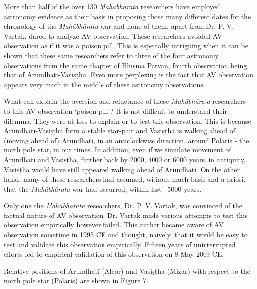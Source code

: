 More than half of the over 130 \textit{Mahābhārata} researchers have employed astronomy evidence as their basis in proposing those many different dates for the chronology of the \textit{Mahābhārata} war and none of them, apart from Dr. P. V. Vartak, dared to analyze AV observation. These researchers avoided AV observation as if it was a poison pill. This is especially intriguing when it can be shown that these same researchers refer to three of the four astronomy observations from the same chapter of Bhīṣma Parvan, fourth observation being that of Arundhatī-Vasiṣṭha. Even more perplexing is the fact that AV observation appears very much in the middle of these astronomy observations.

What can explain the aversion and reluctance of these \textit{Mahābhārata} researchers to this AV observation ‘poison pill’? It is not difficult to understand their dilemma. They were at loss to explain or to test this observation. This is because Arundhatī-Vasiṣṭha form a stable star-pair and Vasiṣṭha is walking ahead of (moving ahead of) Arundhati, in an anticlockwise direction, around Polaris - the north pole star, in our times. In addition, even if we simulate movement of Arundhatī and Vasiṣṭha, further back by 2000, 4000 or 6000 years, in antiquity, Vasiṣṭha would have still appeared walking ahead of Arundhati. On the other hand, many of these researchers had assumed, without much basis and a priori, that the \textit{Mahābhārata} war had occurred, within last ~5000 years.

Only one the \textit{Mahābhārata} researchers, Dr. P. V. Vartak, was convinced of the factual nature of AV observation. Dr. Vartak made various attempts to test this observation empirically however failed. This author became aware of AV observation sometime in 1995 CE and thought, naively, that it would be easy to test and validate this observation empirically. Fifteen years of uninterrupted efforts led to empirical validation of this observation on 8 May 2009 CE.

Relative positions of Arundhatī (Alcor) and Vasiṣṭha (Mizar) with respect to the north pole star (Polaris) are shown in Figure 7.

